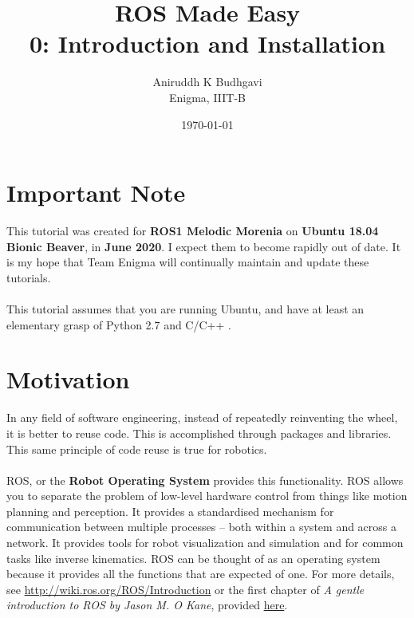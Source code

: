 \documentclass{article}
\title{ROS Made Easy \\0: Introduction and Installation}
\date{\today}
\author{Aniruddh K Budhgavi \\Enigma, IIIT-B}
\begin{document}
    \maketitle
    \section{Important Note}
    This tutorial was created for \textbf{ROS1 Melodic Morenia}
    on \textbf{Ubuntu 18.04 Bionic Beaver}, in \textbf{June 2020}.
    I expect them to become rapidly out of date. It is my hope
    that Team Enigma will continually maintain and update these tutorials.
    \\
    \\
    This tutorial assumes that you are running Ubuntu, and have at least an
    elementary grasp of Python 2.7 and C/C++ .
    \section{Motivation}
    In any field of software engineering, instead
    of repeatedly reinventing the wheel, it is better to
    reuse code. This is accomplished through packages and libraries.
    This same principle of code reuse is true for robotics.
    \\
    \\
    ROS, or the \textbf{Robot Operating System} provides this
    functionality. ROS allows you to separate the problem of
    low-level hardware control from things like motion planning and
    perception. It provides a standardised mechanism for communication
    between multiple processes -- both within a system and across a network.
    It provides tools for robot visualization and simulation
    and for common tasks like inverse kinematics. ROS can be thought
    of as an operating system because it provides all the functions
    that are expected of one. For more details, see \url{http://wiki.ros.org/ROS/Introduction}
    or the first chapter of \emph{A gentle introduction to ROS by Jason M. O Kane}, provided 
    \href{https://github.com/aniruddhkb/enigmatutorials/blob/master/intro2ros/tutorial_docs/agitr-small.pdf}{here}.
\end{document}
